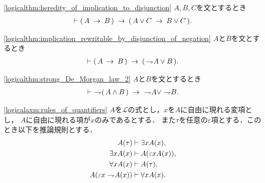 	\begin{screen}
		\begin{logicalthm}[含意の論理和への遺伝性]
		\ref{logicalthm:heredity_of_implication_to_disjunction}
			$A,B,C$を文とするとき
			\begin{align}
				\vdash (\, A \hspace{0.25em}\rightarrow\hspace{0.25em} B\, ) \hspace{0.25em}\rightarrow\hspace{0.25em} (\, A \vee C \hspace{0.25em}\rightarrow\hspace{0.25em} B \vee C\, ).
			\end{align}
		\end{logicalthm}
	\end{screen}
	
	\begin{screen}
		\begin{logicalthm}[含意は否定と論理和で表せる]
		\ref{logicalthm:implication_rewritable_by_disjunction_of_negation}
			$A$と$B$を文とするとき
			\begin{align}
				\vdash (\, A \hspace{0.25em}\rightarrow\hspace{0.25em} B\, ) \hspace{0.25em}\rightarrow\hspace{0.25em} (\, \rightharpoondown\hspace{-0.25em} A \vee B\, ).
			\end{align}
		\end{logicalthm}
	\end{screen}
	
	\begin{screen}
		\begin{logicalthm}
		\ref{logicalthm:strong_De_Morgan_law_2}
			$A$と$B$を文とするとき
			\begin{align}
				\vdash\ \rightharpoondown\hspace{-0.25em} (\, A \wedge B\, )
				\hspace{0.25em}\rightarrow\hspace{0.25em}\ \rightharpoondown\hspace{-0.25em} A \vee \rightharpoondown\hspace{-0.25em} B.
			\end{align}
		\end{logicalthm}
	\end{screen}
	
	\begin{screen}
		\begin{logicalaxm}[量化記号に関する規則]
		\ref{logicalaxm:rules_of_quantifiers}
			$A$を$\mathcal{L}$の式とし，$x$を$A$に自由に現れる変項とし，
			$A$に自由に現れる項が$x$のみであるとする．
			また$\tau$を任意の$\varepsilon$項とする．このとき以下を推論規則とする．
			\begin{align}
				A(\tau) &\vdash \exists x A(x), \\
				\exists x A(x) &\vdash A(\varepsilon x A(x)), \\
				\forall x A(x) &\vdash A(\tau), \\
				A(\varepsilon x \rightharpoondown\hspace{-0.25em} A(x)) &\vdash \forall x A(x).
			\end{align}
		\end{logicalaxm}
	\end{screen}
	
